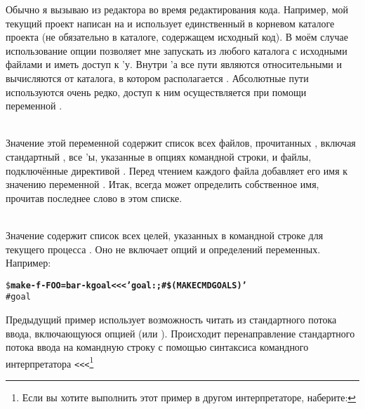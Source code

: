 \begin{description}
Обычно я вызываю \GNUmake{} из редактора  во время
редактирования кода. Например, мой текущий проект написан на \Java{} и
использует единственный \Makefile{} в корневом каталоге проекта (не
обязательно в каталоге, содержащем исходный код). В моём случае
использование опции  позволяет мне
запускать \GNUmake{} из любого каталога с исходными файлами и иметь
доступ к \Makefile{}'у. Внутри \Makefile{}'а все пути являются
относительными и вычисляются от каталога, в котором располагается
\Makefile{}. Абсолютные пути используются очень редко, доступ к ним
осуществляется при помощи переменной .

\item[\variable{MAKEFILE\_LIST}] \hfill \\
Значение этой переменной содержит список всех файлов, прочитанных
\GNUmake{}, включая стандартный \Makefile{}, все \Makefile{}'ы,
указанные в опциях командной строки, и файлы, подключённые директивой
. Перед чтением каждого файла \GNUmake{} добавляет
его имя к значению переменной . Итак,
\Makefile{} всегда может определить собственное имя, прочитав
последнее слово в этом списке.

\item[\variable{MAKECMDGOALS}] \hfill \\
Значение  содержит список всех целей, указанных
в командной строке для текущего процесса \GNUmake{}. Оно не включает
опций и определений переменных. Например:

{\footnotesize
\begin{alltt}
\$ \textbf{make -f- FOO=bar -k goal <<< 'goal:;\#{} \$(MAKECMDGOALS)'}
\#{} goal
\end{alltt}
}

Предыдущий пример использует возможность \GNUmake{} читать \Makefile{}
из стандартного потока ввода, включающуюся опцией 
 (или
). Происходит перенаправление стандартного потока
ввода на командную строку с помощью синтаксиса командного
интерпретатора  \verb|<<<|\footnote{ Если вы хотите
выполнить этот пример в другом интерпретаторе, наберите:

}
\end{description}

